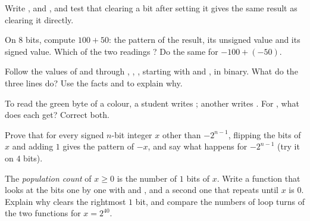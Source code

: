\begin{exercise}[$\star\star$]\label{exo:g10:machine-integers:8}
Write ,  and , and test that clearing a bit after
setting it gives the same result as clearing it directly.
\end{exercise}

\begin{exercise}[$\star\star$]\label{exo:g10:machine-integers:9}
On $8$ bits, compute $100 + 50$: the pattern of the result, its unsigned value and its signed value. Which of the two
readings ? Do the same for $-100 + (-50)$.
\end{exercise}

\begin{exercise}[$\star\star$]\label{exo:g10:machine-integers:10}
Follow the values of  and  through , , , starting with
 and , in binary. What do the three lines do? Use the facts  and
 to explain why.
\end{exercise}

\begin{exercise}[$\star\star$]\label{exo:g10:machine-integers:11}
To read the green byte of a colour, a student writes ; another writes . For
, what does each get? Correct both.
\end{exercise}

\begin{exercise}[$\star\star\star$]\label{exo:g10:machine-integers:12}
Prove that for every signed $n$-bit integer $x$ other than $-2^{n-1}$, flipping the bits of $x$ and adding $1$ gives the
pattern of $-x$, and say what happens for $-2^{n-1}$ (try it on $4$ bits).
\end{exercise}

\begin{exercise}[$\star\star\star$]\label{exo:g10:machine-integers:13}
The \emph{population count} of $x \ge 0$ is the number of $1$ bits of $x$. Write a function that looks at the bits one
by one with  and , and a second one that repeats  until $x$ is $0$.
Explain why  clears the rightmost $1$ bit, and compare the numbers of loop turns of the two functions
for $x = 2^{40}$.
\end{exercise}

